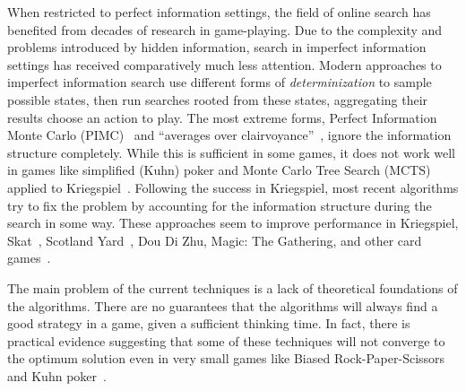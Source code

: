 \documentclass[letterpaper]{article}
\begin{document}
When restricted to perfect information settings, the field of online search has benefited from decades of research in game-playing. 
Due to the complexity and problems introduced by hidden information, search in imperfect information settings has received comparatively much less attention.
Modern approaches to imperfect information search use different forms of {\it determinization} to sample possible states, then run 
searches rooted from these states, aggregating their results choose an action to play. The most extreme forms, Perfect Information Monte Carlo (PIMC)~\cite{Long10Understanding} and ``averages over clairvoyance''~\cite{AIBook},
ignore the information structure completely. While this is sufficient in some games, it does not work well in games like simplified (Kuhn) poker and 
Monte Carlo Tree Search (MCTS) applied to Kriegspiel~\cite{Ciancarini10Kriegspiel}. 
Following the success in Kriegspiel, most recent algorithms try to fix the problem by accounting for the information structure during the 
search in some way. These approaches seem to improve performance in Kriegspiel, Skat~\cite{Furtak13Recursive}, 
Scotland Yard~\cite{Nijssen12SY}, Dou Di Zhu, Magic: The Gathering, and other card games~\cite{Cowling12MTG,Cowling12ISMCTS}.


The main problem of the current techniques is a lack of theoretical foundations of the algorithms. There are no guarantees that the algorithms will always find a good strategy in a game, given a sufficient thinking time. In fact, there is practical evidence suggesting that some of these techniques will not converge to the optimum solution even in very small games like Biased Rock-Paper-Scissors and Kuhn poker~\cite{Shafiei09,Ponsen11Computing}.
\end{document}
